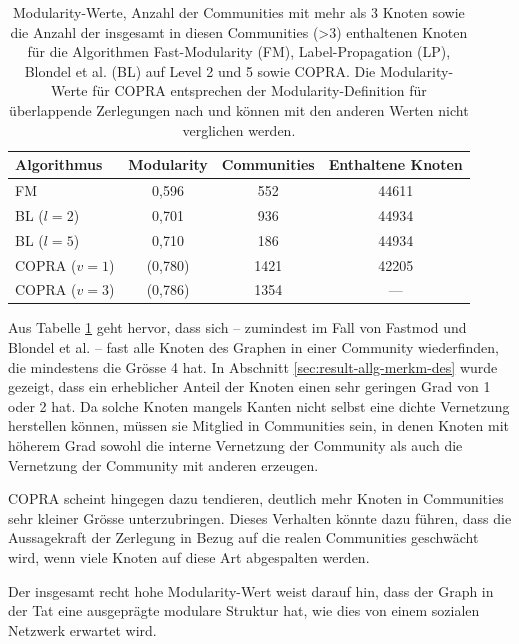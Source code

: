 \begin{table}[t]
  \centering
  \footnotesize
  \begin{tabular}{l|c|c|c}
    Algorithmus & Modularity & Communities &
    Enthaltene Knoten \\
    \hline
    FM & 0,596 & 552 & 44611 \\
    \hline
    BL ($l=2$)& 0,701 & 936 & 44934 \\
    BL ($l=5$)& 0,710 & 186 & 44934 \\
    \hline
    COPRA ($v=1$) & (0,780) & 1421 & 42205 \\
    COPRA ($v=3$) & (0,786) & 1354 & --- \\

  \end{tabular}
  \caption{Modularity-Werte, Anzahl der Communities mit mehr als 3
    Knoten sowie die Anzahl der insgesamt in diesen Communities (>3) enthaltenen
    Knoten 
    f\"ur die Algorithmen Fast-Modularity (FM), Label-Propagation
    (LP), Blondel et al. (BL) auf Level 2 und 5 sowie COPRA. Die
    Modularity-Werte f\"ur COPRA entsprechen der Modularity-Definition
    f\"ur \"uberlappende Zerlegungen nach \cite{Nicosia2009} und k\"onnen mit den anderen
    Werten nicht verglichen werden.}
  \label{tab:mod-result}
\end{table}

Aus Tabelle \ref{tab:mod-result} geht hervor, dass sich -- zumindest
im Fall von Fastmod und Blondel et al. -- fast alle Knoten des Graphen
in einer Community wiederfinden, die mindestens die Gr\"osse 4 hat. In
Abschnitt \ref{sec:result-allg-merkm-des} wurde gezeigt, dass ein
erheblicher Anteil der Knoten einen sehr geringen Grad von 1 oder 2
hat. Da solche Knoten mangels Kanten nicht selbst eine dichte
Vernetzung herstellen k\"onnen, m\"ussen sie Mitglied in Communities
sein, in denen Knoten mit h\"oherem Grad sowohl die interne Vernetzung
der Community als auch die Vernetzung der Community mit anderen
erzeugen.

COPRA scheint hingegen dazu tendieren, deutlich mehr Knoten in
Communities sehr kleiner Gr\"osse unterzubringen. Dieses Verhalten
k\"onnte dazu f\"uhren, dass die Aussagekraft der Zerlegung in Bezug
auf die realen Communities geschw\"acht wird, wenn viele Knoten auf
diese Art abgespalten werden.


Der insgesamt recht hohe Modularity-Wert weist darauf hin, dass der
Graph in der Tat eine ausgepr\"agte modulare Struktur hat, wie dies
von einem sozialen Netzwerk erwartet wird.

